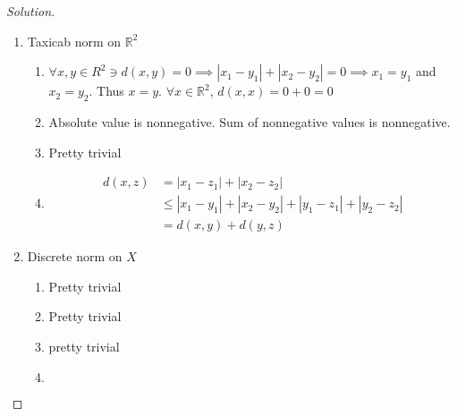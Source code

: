 \documentclass{article}
\newcommand{\R}{\mathbb{R}}
\newcommand{\abs}[1]{\left\lvert #1\right\rvert}
\newenvironment{solution}
{\renewcommand\qedsymbol{$\blacksquare$}\begin{proof}[Solution]}
{\end{proof}}
\begin{document}
\begin{solution}
\begin{enumerate}
\begin{enumerate}
            \item absolute value is nonnegative. max of nonnegative values is nonnegative.
            \item \[d(x,y) = \max\left\{ \abs{x_1 - y_1}, \abs{x_2 - y_2} \right\} =\max\left\{ \abs{y_1 - x_1}, \abs{y_2 - x_2} \right\} = d(y, x)\] 
            \item \begin{align*}
                d(x, z) &= \max\left\{ \abs{x_1 - z_1}, \abs{x_2 - z_2} \right\} \\
                &\leq \max\left\{ \abs{x_1 - y_1} + \abs{y_1 - z_1}, \abs{x_2 - y_2} + \abs{y_2 - z_2} \right\} \\
                &\leq \max\left\{\abs{x_1 - y_1}, \abs{x_2 - y_2}  \right\} + \max\left\{ \abs{y_1 - z_1}, \abs{y_2 - z_2} \right\} \\
                &= d(x,y) + d(x,z)
            \end{align*}
        \end{enumerate}
        \item Taxicab norm on $\R^2$
        \begin{enumerate}
            \item $\forall x, y \in R^2 \ni d(x, y) = 0 \implies \abs{x_1 - y_1} + \abs{x_2 - y_2} = 0 \implies x_1 = y_1$ and $x_2 = y_2$. Thus $x = y$. 
            $\forall x \in \R^2$, $d(x, x) = 0 + 0 = 0$  
            \item Absolute value is nonnegative. Sum of nonnegative values is nonnegative. 
            \item Pretty trivial
            \item \begin{align*}
                d(x, z) &= \abs{x_1 - z_1} + \abs{x_2 - z_2} \\
                &\leq \abs{x_1 - y_1} + \abs{x_2 - y_2} + \abs{y_1 - z_1} + \abs{y_2 - z_2} \\
                &= d(x,y) + d(y, z)
            \end{align*}  
        \end{enumerate}
        \item Discrete norm on $X$
        \begin{enumerate}
            \item Pretty trivial
            \item Pretty trivial
            \item pretty trivial
            \item \begin{align*}

\end{align*}
\end{enumerate}
\end{enumerate}
\end{solution}
\end{document}

